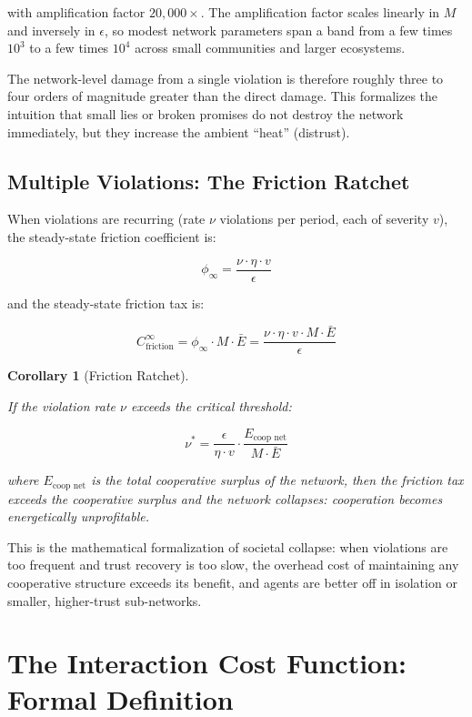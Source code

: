 \documentclass[11pt]{article}
\theoremstyle{plain}
\newtheorem{corollary}[theorem]{Corollary}
\theoremstyle{definition}
\theoremstyle{remark}
\let\origsection\section
\renewcommand{\section}{\needspace{12\baselineskip}\origsection}
\let\origsubsection\subsection
\renewcommand{\subsection}{\needspace{7\baselineskip}\origsubsection}
\begin{document}
with amplification factor \(20{,}000\times\). The amplification factor
scales linearly in \(M\) and inversely in \(\epsilon\), so modest
network parameters span a band from a few times \(10^3\) to a few times
\(10^4\) across small communities and larger ecosystems.

The network-level damage from a single violation is therefore roughly
three to four orders of magnitude greater than the direct damage. This
formalizes the intuition that small lies or broken promises do not
destroy the network immediately, but they increase the ambient ``heat''
(distrust).

\subsection{Multiple Violations: The Friction
Ratchet}\label{multiple-violations-the-friction-ratchet}

When violations are recurring (rate \(\nu\) violations per period, each
of severity \(v\)), the steady-state friction coefficient is:

\[\phi_{\infty} = \frac{\nu \cdot \eta \cdot v}{\epsilon}\]

and the steady-state friction tax is:

\[C_{\text{friction}}^{\infty} = \phi_{\infty} \cdot M \cdot \bar{E} = \frac{\nu \cdot \eta \cdot v \cdot M \cdot \bar{E}}{\epsilon}\]

\begin{corollary}[Friction Ratchet]
\label{cor-friction-ratchet}

If the violation rate $\nu$ exceeds the critical threshold:

$$\nu^* = \frac{\epsilon}{\eta \cdot v} \cdot \frac{E_{\text{coop net}}}{M \cdot \bar{E}}$$

where $E_{\text{coop net}}$ is the total cooperative surplus of the network, then the friction tax exceeds the cooperative surplus and the network collapses: cooperation becomes energetically unprofitable.
\end{corollary}

This is the mathematical formalization of societal collapse: when
violations are too frequent and trust recovery is too slow, the overhead
cost of maintaining any cooperative structure exceeds its benefit, and
agents are better off in isolation or smaller, higher-trust
sub-networks.

\section{The Interaction Cost Function: Formal
Definition}\label{the-interaction-cost-function-formal-definition}
\end{document}

